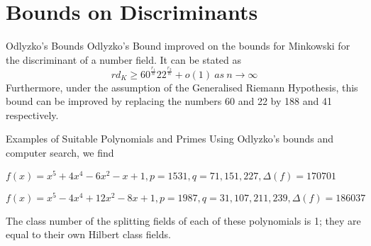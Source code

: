 \documentclass[10pt]{beamer}
\begin{document}
\section{Bounds on Discriminants}
\begin{frame}{Odlyzko's Bounds}
    Odlyzko's Bound improved on the bounds for Minkowski for the discriminant of a number field. It can be stated as  
\begin{equation}
rd_K\geqslant 60^{\frac{r_1}{n}}22^{\frac{r_2}{n}}+o(1)\:as\:n\rightarrow \infty   
\end{equation}
Furthermore, under the assumption of the Generalised Riemann Hypothesis, 
this bound can be improved by replacing the numbers 60 and 22 by 188 and 41 respectively. 
\end{frame}

\begin{frame}{Examples of Suitable Polynomials and Primes}
Using Odlyzko's bounds and computer search, we find 
\begin{example}
$f(x)=x^5+4x^4-6x^2-x+1, p=1531,q=71,151,227,\Delta(f)=170701$
\end{example}
    \begin{example}
$ f(x)=x^5-4x^4+12x^2-8x+1,p=1987,q=31,107,211,239,\Delta(f)=186037$
\end{example}
The class number of the splitting fields of each of these polynomials is 1; they are equal to their own Hilbert class fields.  
\end{frame}
\end{document}
